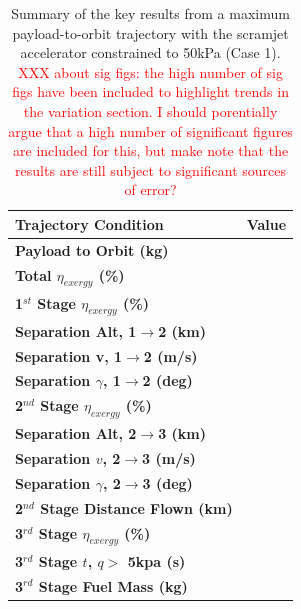\begin{table}[ht]%
	\centering
	
	\begin{tabular}{l c } 
		\hline \textbf{Trajectory Condition}
		&Value
		\\
		\hline \textbf{Payload to Orbit (kg)}
		& \textbf{\PayloadToOrbitConstqNoReturn}
		\\
		\textbf{Total $\eta_{exergy}$ (\%)}
		& \textbf{\totalExergyEffConstqNoReturn}
		\\
		\hline 
		\textbf{1$^{st}$ Stage $\eta_{exergy}$ (\%)}
		& \textbf{\firstExergyEffConstqNoReturn}
		\\
	
		\textbf{Separation Alt, 1$\rightarrow$2 (km)}
		& \firstsecondSeparationAltConstqNoReturn
		\\
		\textbf{Separation v, 1$\rightarrow$2 (m/s)}
		& \firstsecondSeparationvConstqNoReturn
		\\
		\textbf{Separation $\gamma$, 1$\rightarrow$2 (deg)}
		& \firstsecondSeparationgammaConstqNoReturn
		\\
		\hline 
		\textbf{2$^{nd}$ Stage $\eta_{exergy}$ (\%)}
		& \textbf{\secondExergyEffConstqNoReturn}
		\\
		\textbf{Separation Alt, 2$\rightarrow$3 (km)}
		& \secondthirdSeparationAltConstqNoReturn
		\\
		\textbf{Separation $v$, 2$\rightarrow$3 (m/s)}
		& \secondthirdSeparationvConstqNoReturn
		\\
		\textbf{Separation $\gamma$, 2$\rightarrow$3 (deg)}
		& \secondthirdSeparationgammaConstqNoReturn
		\\
		\textbf{2$^{nd}$ Stage Distance Flown (km)}
		& \SecondDistConstqNoReturn
		\\
		\hline 
		\textbf{3$^{rd}$ Stage $\eta_{exergy}$ (\%)}
		& \textbf{\thirddExergyEffConstqNoReturn}
		\\
	
		\textbf{3$^{rd}$ Stage $t$, $q >$ 5kpa (s)}
		& \thirdqOverFiveConstqNoReturn
		\\
		\textbf{3$^{rd}$ Stage Fuel Mass (kg)}
		& \thirdmFuelConstqNoReturn
		\\
		\hline 
	\end{tabular} 
	
	\caption{Summary of the key results from a maximum payload-to-orbit trajectory with the scramjet accelerator constrained to 50kPa (Case 1). \textcolor{red}{XXX about sig figs: the high number of sig figs have been included to highlight trends in the variation section. I should porentially argue that a high number of significant figures are included for this, but make note that the results are still subject to significant sources of error? }}
	\label{tab:constqsummary} %
\end{table}
